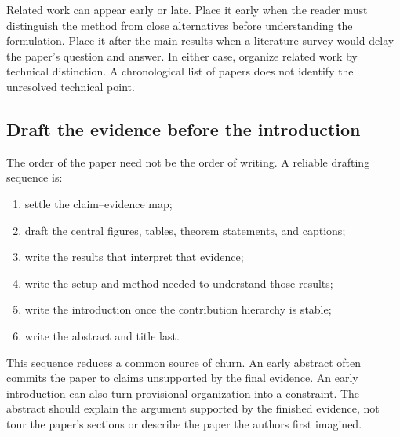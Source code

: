 Related work can appear early or late. Place it early when the reader must
distinguish the method from close alternatives before understanding the
formulation. Place it after the main results when a literature survey would
delay the paper's question and answer. In either case, organize related work by
technical distinction. A chronological list of papers does not identify the
unresolved technical point.

\subsection{Draft the evidence before the introduction}

The order of the paper need not be the order of writing. A reliable drafting
sequence is:

\begin{enumerate}[leftmargin=*]
    \item settle the claim--evidence map;
    \item draft the central figures, tables, theorem statements, and captions;
    \item write the results that interpret that evidence;
    \item write the setup and method needed to understand those results;
    \item write the introduction once the contribution hierarchy is stable;
    \item write the abstract and title last.
\end{enumerate}

This sequence reduces a common source of churn. An early abstract often
commits the paper to claims unsupported by the final evidence. An early
introduction can also turn provisional organization into a constraint. The
abstract should explain the argument supported by the finished evidence, not
tour the paper's sections or describe the paper the authors first imagined.

